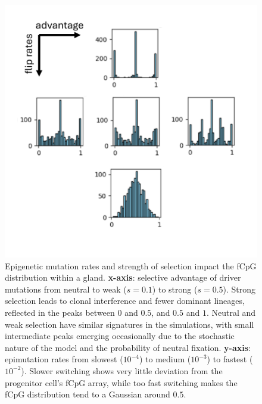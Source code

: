\begin{figure}[h]
    \centering
    \includegraphics[width=\textwidth]{Chapter_4/figures/sens_fig_1.pdf}
    \caption{Epigenetic mutation rates and strength of selection impact the
    fCpG distribution within a gland. \textbf{x-axis}: selective advantage of
    driver mutations from neutral to weak ($s=0.1$) to strong ($s=0.5$).
    Strong selection leads to clonal interference and fewer dominant lineages,
    reflected in the peaks between $0$ and $0.5$, and $0.5$ and $1$. Neutral
    and weak selection have similar signatures in the simulations, with small
    intermediate peaks emerging occasionally due to the stochastic nature of the
    model and the probability of neutral fixation. \textbf{y-axis}: epimutation
    rates from slowest ($10^{-4}$) to medium ($10^{-3}$) to fastest ($10^{-2}$).
    Slower switching shows very little deviation from the progenitor cell's
    fCpG array, while too fast switching makes the fCpG distribution tend to a
    Gaussian around $0.5$.}
    \label{fig:sensitivity_analysis_1}
\end{figure}


